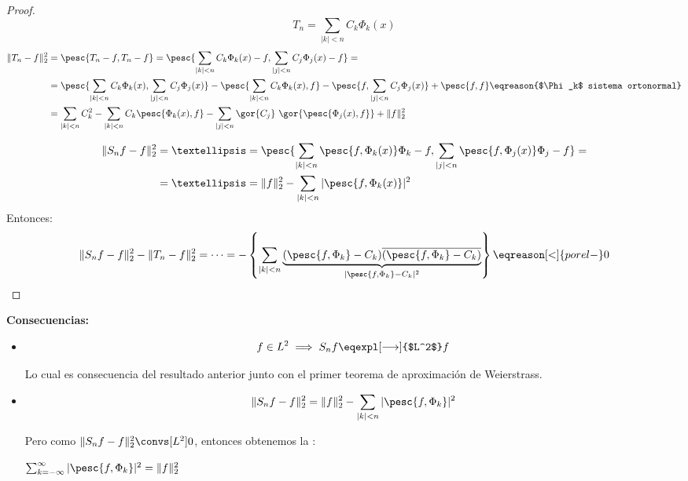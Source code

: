 			\begin{proof}
				\[ T_n = \sum_{|k| < n} C_k \Phi_k(x) \]
				\begin{align*}
					\| T_n - f \|_{2}^2 &=  \pesc{T_n -f, T_n - f} = \pesc{\sum_{|k| < n} C_k \Phi_k(x) - f, \sum_{|j| < n} C_j \Phi_j(x) - f} =\\
					&= \pesc{\sum_{|k| < n} C_k \Phi_k(x), \sum_{|j| < n} C_j \Phi_j(x)} - \pesc{\sum_{|k| < n} C_k \Phi_k(x), f} - \pesc{f, \sum_{|j| < n} C_j \Phi_j(x)} + \pesc{f,f} \eqreason{$\Phi_k$ sistema ortonormal}\\
					&= \sum_{|k| < n} C_k^2 - \sum_{|k| < n} C_k \pesc{\Phi_k(x),f} - \sum_{|j| < n} \gor{C_j} \ \gor{\pesc{\Phi_j(x),f}} + \|f\|_2^2
				\end{align*}

				\begin{align*}
				\| S_n f - f \|_2^2 = … &= \pesc{\sum_{|k| < n} \pesc{f,\Phi_k(x)} \Phi_k -f,  \sum_{|j| < n} \pesc{f,\Phi_j(x)} \Phi_j -f} =\\
				= … &= \|f\|_2^2 - \sum_{|k| < n} |\pesc{f,\Phi_k(x)}|^2
				\end{align*}
				Entonces:
				\[ \| S_n f - f \|_2^2 - \|T_n -f\|_2^2 = \dots = - \left\{ \sum_{|k| < n} \underbrace{( \pesc{f,\Phi_k} - C_k) \overline{(\pesc{f,\Phi_k} - C_k)}}_{|\pesc{f, \Phi_k} - C_k|^2 } \right\} \eqreason[<]{por el -} 0 \]


			\end{proof}

		\newpage %
		\textbf{Consecuencias:}
		\begin{itemize}

			\item  \[ f \in L^2 \implies S_n f \eqexpl[\longrightarrow]{$L^2$} f \]

			Lo cual es consecuencia del resultado anterior junto con el primer teorema de aproximación de Weierstrass.

			\item \[ \| S_n f - f \|_{2}^2 = \| f \|^2_2 - \sum_{|k|<n} | \pesc{f, \Phi_k} |^2  \]

			Pero como $\| S_n f - f \|_{2}^2 \convs[L^2] 0$, entonces obtenemos la :

			\( \sum_{k= -\infty}^\infty  |\pesc{f, \Phi_k}|^2 = \|f\|^2_2 \label{eq:identidad-parseval} \)


		\end{itemize}



